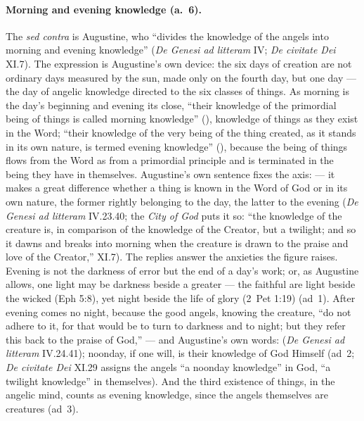 \paragraph{Morning and evening knowledge (a.~6).} The \emph{sed contra} is
Augustine, who ``divides the knowledge of the angels into morning and
evening knowledge'' (\emph{De Genesi ad litteram} IV; \emph{De civitate
Dei} XI.7). The expression is Augustine's own device: the six days of
creation are not ordinary days measured by the sun, made only on the
fourth day, but one day --- the day of angelic knowledge directed to the
six classes of things. As morning is the day's beginning and evening its
close, ``their knowledge of the primordial being of things is called
morning knowledge'' (), knowledge of things as
they exist in the Word; ``their knowledge of the very being of the thing
created, as it stands in its own nature, is termed evening knowledge''
(), because the being of things flows from the
Word as from a primordial principle and is terminated in the being they
have in themselves. Augustine's own sentence fixes the axis:  ---
it makes a great difference whether a thing is known in the Word of God
or in its own nature, the former rightly belonging to the day, the latter
to the evening (\emph{De Genesi ad litteram} IV.23.40; the \emph{City of
God} puts it so: ``the knowledge of the creature is, in comparison
of the knowledge of the Creator, but a twilight; and so it dawns and
breaks into morning when the creature is drawn to the praise and love of
the Creator,'' XI.7). The replies answer the anxieties the figure raises.
Evening is not the darkness of error but the end of a day's work; or, as
Augustine allows, one light may be darkness beside a greater --- the
faithful are light beside the wicked (Eph 5:8), yet night beside the life
of glory (2~Pet 1:19) (ad~1). After evening comes no night, because the
good angels, knowing the creature, ``do not adhere to it, for that would
be to turn to darkness and to night; but they refer this back to the
praise of God,''  --- and
Augustine's own words:  (\emph{De Genesi ad litteram} IV.24.41); noonday, if one will,
is their knowledge of God Himself (ad~2; \emph{De civitate Dei} XI.29
assigns the angels ``a noonday knowledge'' in God, ``a twilight knowledge''
in themselves). And the third existence of things, in the angelic mind,
counts as evening knowledge, since the angels themselves are creatures
(ad~3).

